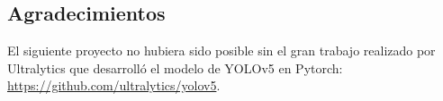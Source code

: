 \pagebreak

\subsection{Agradecimientos}

El siguiente proyecto no hubiera sido posible sin el gran trabajo
realizado por Ultralytics que desarrolló el modelo de YOLOv5 en
Pytorch: \url{https://github.com/ultralytics/yolov5}.






